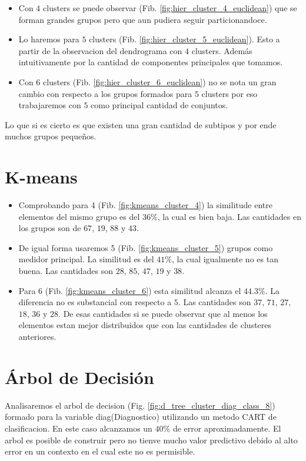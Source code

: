 \documentclass[a4paper,10pt,twocolumn]{article}
\begin{document}
\begin{itemize}
	\item Con $4$ clusters se puede observar (Fib. \ref{fig:hier_cluster_4_euclidean}) que se forman grandes grupos pero que aun pudiera seguir particionandoce.
	\item Lo haremos para $5$ clusters (Fib. \ref{fig:hier_cluster_5_euclidean}). Esto a partir de la observacion del dendrograma con $4$ clusters. Además intuitivamente por la cantidad de componentes principales que tomamos.
	\item Con $6$ clusters (Fib. \ref{fig:hier_cluster_6_euclidean}) no se nota un gran cambio con respecto a los grupos formados para $5$ clusters por eso trabajaremos con $5$ como principal cantidad de conjuntos.
\end{itemize}

Lo que si es cierto es que existen una gran cantidad de subtipos y por ende muchos grupos pequeños.

\section{K-means}\label{sec:kmeans}

\begin{itemize}
	\item Comprobando para 4 (Fib. \ref{fig:kmeans_cluster_4}) la similitude entre elementos del mismo grupo es del $36\%$, la cual es bien baja. Las cantidades en los grupos son de $67$, $19$, $88$ y $43$.
	\item De igual forma usaremos 5 (Fib. \ref{fig:kmeans_cluster_5}) grupos como medidor principal. La similitud es del $41\%$, la cual igualmente no es tan buena. Las cantidades son $28$, $85$, $47$, $19$ y $38$.
	\item Para 6 (Fib. \ref{fig:kmeans_cluster_6}) esta similitud alcanza el $44.3\%$. La diferencia no es substancial con respecto a $5$. Las cantidades son $37$, $71$, $27$, $18$, $36$ y $28$. De esas cantidades si se puede observar que al menos los elementos estan mejor distribuidos que con las cantidades de clusteres anteriores.
\end{itemize}

\section{Árbol de Decisión}\label{sec:dtree}

Analisaremos el arbol de decision (Fig. \ref{fig:d_tree_cluster_diag_class_8}) formado para la variable diag(Diagnostico) utilizando un metodo CART de clasificacion. En este caso alcanzamos un $40\%$ de error aproximadamente. El arbol es posible de construir pero no tienve mucho valor predictivo debido al alto error en un contexto en el cual este no es permisible.
\end{document}
